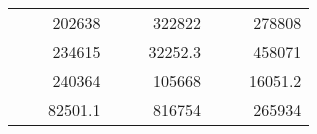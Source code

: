 \begin{table}[H]
\begin{tabular}{|ccrccrccc}
\rowcolor[HTML]{DAE8FC} 
\multicolumn{1}{|c|}{\cellcolor[HTML]{FFFFC7}}                                & \multicolumn{1}{c|}{\cellcolor[HTML]{DAE8FC}}                      & \multicolumn{1}{r|}{\cellcolor[HTML]{DAE8FC}202638}    & \multicolumn{1}{c|}{\cellcolor[HTML]{FFFFC7}}                                & \multicolumn{1}{c|}{\cellcolor[HTML]{DAE8FC}}                       & \multicolumn{1}{r|}{\cellcolor[HTML]{DAE8FC}322822}    & \multicolumn{1}{c|}{\cellcolor[HTML]{FFFFC7}}                                & \multicolumn{1}{c|}{\cellcolor[HTML]{DAE8FC}}                      & \multicolumn{1}{r|}{\cellcolor[HTML]{DAE8FC}278808}    \\ \cline{3-3} \cline{6-6} \cline{9-9} 
\multicolumn{1}{|c|}{\cellcolor[HTML]{FFFFC7}}                                & \multicolumn{1}{c|}{\cellcolor[HTML]{DAE8FC}}                      & \multicolumn{1}{r|}{\cellcolor[HTML]{DDFDFF}234615}    & \multicolumn{1}{c|}{\cellcolor[HTML]{FFFFC7}}                                & \multicolumn{1}{c|}{\cellcolor[HTML]{DAE8FC}}                       & \multicolumn{1}{r|}{\cellcolor[HTML]{DDFDFF}32252.3}   & \multicolumn{1}{c|}{\cellcolor[HTML]{FFFFC7}}                                & \multicolumn{1}{c|}{\cellcolor[HTML]{DAE8FC}}                      & \multicolumn{1}{r|}{\cellcolor[HTML]{DDFDFF}458071}    \\ \cline{3-3} \cline{6-6} \cline{9-9} 
\rowcolor[HTML]{DAE8FC} 
\multicolumn{1}{|c|}{\cellcolor[HTML]{FFFFC7}}                                & \multicolumn{1}{c|}{\cellcolor[HTML]{DAE8FC}}                      & \multicolumn{1}{r|}{\cellcolor[HTML]{DAE8FC}240364}    & \multicolumn{1}{c|}{\cellcolor[HTML]{FFFFC7}}                                & \multicolumn{1}{c|}{\cellcolor[HTML]{DAE8FC}}                       & \multicolumn{1}{r|}{\cellcolor[HTML]{DAE8FC}105668}    & \multicolumn{1}{c|}{\cellcolor[HTML]{FFFFC7}}                                & \multicolumn{1}{c|}{\cellcolor[HTML]{DAE8FC}}                      & \multicolumn{1}{r|}{\cellcolor[HTML]{DAE8FC}16051.2}   \\ \cline{3-3} \cline{6-6} \cline{9-9} 
\multicolumn{1}{|c|}{\cellcolor[HTML]{FFFFC7}}                                & \multicolumn{1}{c|}{\cellcolor[HTML]{DAE8FC}}                      & \multicolumn{1}{r|}{\cellcolor[HTML]{DDFDFF}82501.1}   & \multicolumn{1}{c|}{\cellcolor[HTML]{FFFFC7}}                                & \multicolumn{1}{c|}{\cellcolor[HTML]{DAE8FC}}                       & \multicolumn{1}{r|}{\cellcolor[HTML]{DDFDFF}816754}    & \multicolumn{1}{c|}{\cellcolor[HTML]{FFFFC7}}                                & \multicolumn{1}{c|}{\cellcolor[HTML]{DAE8FC}}                      & \multicolumn{1}{r|}{\cellcolor[HTML]{DDFDFF}265934}    \\ \cline{3-3} \cline{6-6} \cline{9-9} 

\end{tabular}
\end{table}
